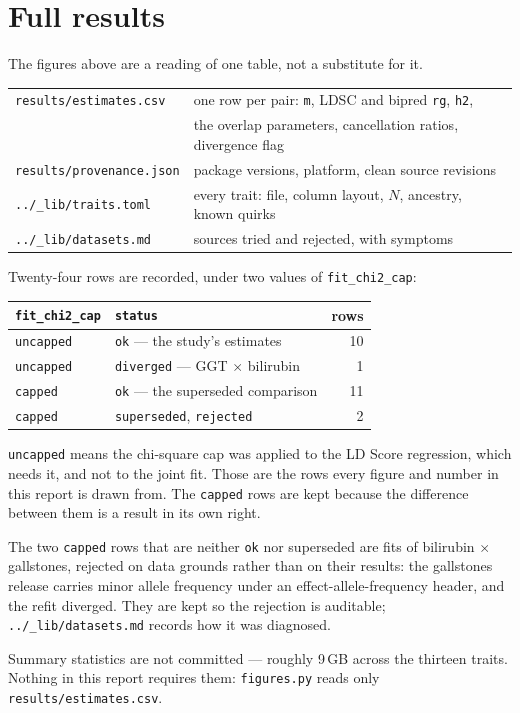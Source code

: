 \section*{Full results}

The figures above are a reading of one table, not a substitute for it.

\begin{center}
\begin{tabular}{@{}ll@{}}
\toprule
\texttt{results/estimates.csv} & one row per pair: \texttt{m}, LDSC and bipred
  \texttt{rg}, \texttt{h2}, \\
  & the overlap parameters, cancellation ratios, divergence flag \\
\texttt{results/provenance.json} & package versions, platform, clean source
  revisions \\
\texttt{../\_lib/traits.toml} & every trait: file, column layout, $N$,
  ancestry, known quirks \\
\texttt{../\_lib/datasets.md} & sources tried and rejected, with symptoms \\
\bottomrule
\end{tabular}
\end{center}

Twenty-four rows are recorded, under two values of \texttt{fit\_chi2\_cap}:

\begin{center}
\begin{tabular}{@{}llr@{}}
\toprule
\texttt{fit\_chi2\_cap} & \texttt{status} & rows \\
\midrule
\texttt{uncapped} & \texttt{ok} --- the study's estimates & 10 \\
\texttt{uncapped} & \texttt{diverged} --- GGT $\times$ bilirubin & 1 \\
\texttt{capped}   & \texttt{ok} --- the superseded comparison & 11 \\
\texttt{capped}   & \texttt{superseded}, \texttt{rejected} & 2 \\
\bottomrule
\end{tabular}
\end{center}

\texttt{uncapped} means the chi-square cap was applied to the LD Score
regression, which needs it, and not to the joint fit. Those are the rows every
figure and number in this report is drawn from. The \texttt{capped} rows are
kept because the difference between them is a result in its own right.

The two \texttt{capped} rows that are neither \texttt{ok} nor superseded are
fits of bilirubin $\times$ gallstones, rejected on data grounds rather than on
their results: the gallstones release carries minor allele frequency under an
effect-allele-frequency header, and the refit diverged. They are kept so the
rejection is auditable; \texttt{../\_lib/datasets.md} records how it was
diagnosed.

Summary statistics are not committed --- roughly 9\,GB across the thirteen
traits. Nothing in this report requires them: \texttt{figures.py} reads only
\texttt{results/estimates.csv}.
